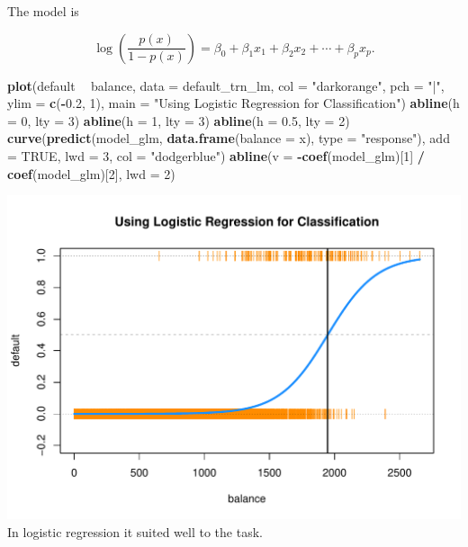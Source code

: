 \documentclass[]{report}
\newenvironment{Shaded}{\begin{snugshade}}{\end{snugshade}}
\newcommand{\KeywordTok}[1]{\textcolor[rgb]{0.13,0.29,0.53}{\textbf{#1}}}
\newcommand{\DataTypeTok}[1]{\textcolor[rgb]{0.13,0.29,0.53}{#1}}
\newcommand{\DecValTok}[1]{\textcolor[rgb]{0.00,0.00,0.81}{#1}}
\newcommand{\FloatTok}[1]{\textcolor[rgb]{0.00,0.00,0.81}{#1}}
\newcommand{\StringTok}[1]{\textcolor[rgb]{0.31,0.60,0.02}{#1}}
\newcommand{\OtherTok}[1]{\textcolor[rgb]{0.56,0.35,0.01}{#1}}
\newcommand{\OperatorTok}[1]{\textcolor[rgb]{0.81,0.36,0.00}{\textbf{#1}}}
\newcommand{\NormalTok}[1]{#1}
\begin{document}
The model is

\[\log\left(\frac{p(x)}{1 - p(x)}\right) = \beta_0 + \beta_1 x_1 + \beta_2 x_2 + \cdots  + \beta_p x_p.\]

\begin{Shaded}
\begin{Highlighting}[]
\KeywordTok{plot}\NormalTok{(default }\OperatorTok{~}\StringTok{ }\NormalTok{balance, }\DataTypeTok{data =}\NormalTok{ default_trn_lm, }
     \DataTypeTok{col =} \StringTok{"darkorange"}\NormalTok{, }\DataTypeTok{pch =} \StringTok{"|"}\NormalTok{, }\DataTypeTok{ylim =} \KeywordTok{c}\NormalTok{(}\OperatorTok{-}\FloatTok{0.2}\NormalTok{, }\DecValTok{1}\NormalTok{),}
     \DataTypeTok{main =} \StringTok{"Using Logistic Regression for Classification"}\NormalTok{)}
\KeywordTok{abline}\NormalTok{(}\DataTypeTok{h =} \DecValTok{0}\NormalTok{, }\DataTypeTok{lty =} \DecValTok{3}\NormalTok{)}
\KeywordTok{abline}\NormalTok{(}\DataTypeTok{h =} \DecValTok{1}\NormalTok{, }\DataTypeTok{lty =} \DecValTok{3}\NormalTok{)}
\KeywordTok{abline}\NormalTok{(}\DataTypeTok{h =} \FloatTok{0.5}\NormalTok{, }\DataTypeTok{lty =} \DecValTok{2}\NormalTok{)}
\KeywordTok{curve}\NormalTok{(}\KeywordTok{predict}\NormalTok{(model_glm, }\KeywordTok{data.frame}\NormalTok{(}\DataTypeTok{balance =}\NormalTok{ x), }\DataTypeTok{type =} \StringTok{"response"}\NormalTok{), }
      \DataTypeTok{add =} \OtherTok{TRUE}\NormalTok{, }\DataTypeTok{lwd =} \DecValTok{3}\NormalTok{, }\DataTypeTok{col =} \StringTok{"dodgerblue"}\NormalTok{)}
\KeywordTok{abline}\NormalTok{(}\DataTypeTok{v =} \OperatorTok{-}\KeywordTok{coef}\NormalTok{(model_glm)[}\DecValTok{1}\NormalTok{] }\OperatorTok{/}\StringTok{ }\KeywordTok{coef}\NormalTok{(model_glm)[}\DecValTok{2}\NormalTok{], }\DataTypeTok{lwd =} \DecValTok{2}\NormalTok{)}
\end{Highlighting}
\end{Shaded}

\includegraphics{MyBook_files/figure-latex/unnamed-chunk-133-1.pdf} In
logistic regression it suited well to the task.
\end{document}
